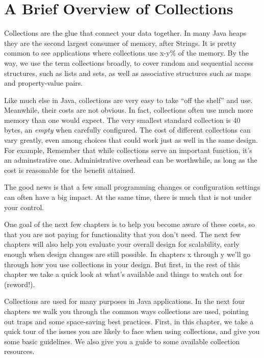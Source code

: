 \chapter{A Brief Overview of Collections}
Collections are the glue that connect your data together. In
many Java heaps they are the second largest consumer of memory, after Strings. 
It is pretty common to see applications where collections use x-y\% of
the memory. By the way, we use the term collections
broadly, to cover random and sequential access structures, such as lists and sets, as well as
associative structures such as maps and property-value pairs.

Like much else in Java, collections are very easy to take
``off the shelf'' and use. Meanwhile, their costs are not obvious. 
In fact, collections often use much more memory than one would expect. The very
smallest standard collection is 40 bytes, an
\emph{empty}  when carefully configured. The cost of
different collections can vary greatly, even among choices that could work just
as well in the same design. For example,
Remember that while
collections serve an important function, it's an adminstrative one.  
Administrative overhead can be worthwhile, as long as
the cost is reasonable for the benefit attained. 

The good news is that a few small programming
changes or configuration settings can often have a big impact. At the same
time, there is much that is not under your control.  

One
goal of the next few chapters is to help you become aware of these costs, 
so that you are not paying for functionality that you don't need.
The next few
chapters will also help you evaluate your overall design for scalability, early
enough when design changes are still possible.  In chapters x through y we'll go
through how you use collections in your design.  But first, in the rest of this
chapter we take a quick look at what's available and things to watch
out for (reword!).

Collections are used for many purposes in Java applications. In the
next four chapters we walk you through the common ways collections are used,
pointing out traps and some space-saving best practices. First, in this
chapter, we take a quick tour of the issues you are likely to face when
using collections, and give you some basic guidelines. We also give you a guide to
some available collection resources.



